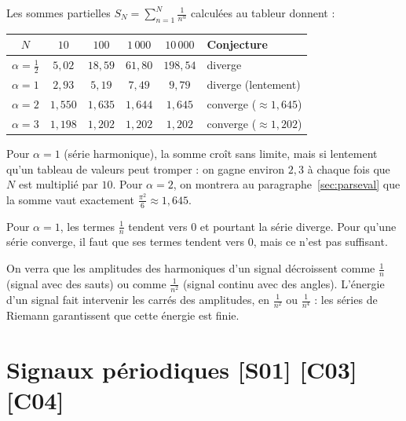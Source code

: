 \documentclass[a4paper,11pt]{article}
\begin{document}
\begin{exemple}\label{ex:riemann}
Les sommes partielles $S_N = \sum_{n=1}^{N}\frac{1}{n^{\alpha}}$ calculées au tableur donnent :
\begin{center}
\renewcommand{\arraystretch}{1.3}
\begin{tabular}{|c|c|c|c|c|l|}
\hline
\rowcolor{uimmlightblue}
$N$ & $10$ & $100$ & $1\,000$ & $10\,000$ & Conjecture \\
\hline
$\alpha = \frac12$ & $5{,}02$ & $18{,}59$ & $61{,}80$ & $198{,}54$ & diverge \\
\hline
$\alpha = 1$ & $2{,}93$ & $5{,}19$ & $7{,}49$ & $9{,}79$ & diverge (lentement) \\
\hline
$\alpha = 2$ & $1{,}550$ & $1{,}635$ & $1{,}644$ & $1{,}645$ & converge ($\approx 1{,}645$) \\
\hline
$\alpha = 3$ & $1{,}198$ & $1{,}202$ & $1{,}202$ & $1{,}202$ & converge ($\approx 1{,}202$) \\
\hline
\end{tabular}
\end{center}
Pour $\alpha = 1$ (série harmonique), la somme croît sans limite, mais si lentement qu'un tableau de valeurs peut tromper : on gagne environ $2{,}3$ à chaque fois que $N$ est multiplié par $10$. Pour $\alpha = 2$, on montrera au paragraphe~\ref{sec:parseval} que la somme vaut exactement $\frac{\pi^2}{6}\approx 1{,}645$.
\end{exemple}

\begin{attention}
Pour $\alpha = 1$, les termes $\frac1n$ tendent vers $0$ et pourtant la série diverge. Pour qu'une série converge, il faut que ses termes tendent vers $0$, mais ce n'est pas suffisant.
\end{attention}

\begin{remarque}
On verra que les amplitudes des harmoniques d'un signal décroissent comme $\frac1n$ (signal avec des sauts) ou comme $\frac1{n^2}$ (signal continu avec des angles). L'énergie d'un signal fait intervenir les carrés des amplitudes, en $\frac{1}{n^2}$ ou $\frac{1}{n^4}$ : les séries de Riemann garantissent que cette énergie est finie.
\end{remarque}

\needspace{7cm}
\section{Signaux périodiques \hfill {\normalsize\color{uimmred}[S01] [C03] [C04]}}\label{sec:signaux}
\end{document}
